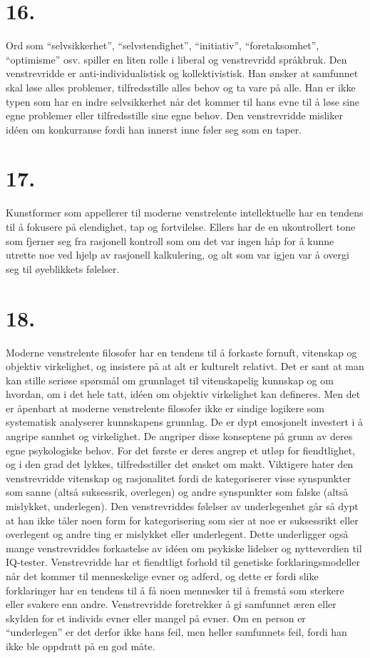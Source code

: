 \documentclass[oneside]{book}
\begin{document}
\section*{16.}
Ord som ``selvsikkerhet'', ``selvstendighet'', ``initiativ'',
``foretaksomhet'', ``optimisme'' osv. spiller en liten rolle i liberal og
venstrevridd språkbruk. Den venstrevridde er anti-individualistisk og
kollektivistisk. Han ønsker at samfunnet skal løse alles problemer,
tilfredsstille alles behov og ta vare på alle. Han er ikke typen som har en
indre selvsikkerhet når det kommer til hans evne til å løse sine egne problemer
eller tilfredsstille sine egne behov. Den venstrevridde misliker idéen om
konkurranse fordi han innerst inne føler seg som en taper.

\section*{17.}
Kunstformer som appellerer til moderne venstrelente intellektuelle har en
tendens til å fokusere på elendighet, tap og fortvilelse. Ellers har de en
ukontrollert tone som fjerner seg fra rasjonell kontroll som om det var ingen
håp for å kunne utrette noe ved hjelp av rasjonell kalkulering, og alt som var
igjen var å overgi seg til øyeblikkets følelser.

\section*{18.}
Moderne venstrelente filosofer har en tendens til å forkaste fornuft, vitenskap
og objektiv virkelighet, og insistere på at alt er kulturelt relativt. Det er
sant at man kan stille seriøse spørsmål om grunnlaget til vitenskapelig
kunnskap og om hvordan, om i det hele tatt, idéen om objektiv virkelighet kan
defineres. Men det er åpenbart at moderne venstrelente filosofer ikke er
sindige logikere som systematisk analyserer kunnskapens grunnlag. De er dypt
emosjonelt investert i å angripe sannhet og virkelighet. De angriper disse
konseptene på grunn av deres egne psykologiske behov. For det første er deres
angrep et utløp for fiendtlighet, og i den grad det lykkes, tilfredsstiller det
ønsket om makt. Viktigere hater den venstrevridde vitenskap og rasjonalitet
fordi de kategoriserer visse synspunkter som sanne (altså suksessrik,
overlegen) og andre synspunkter som falske (altså mislykket, underlegen). Den
venstrevriddes følelser av underlegenhet går så dypt at han ikke tåler noen
form for kategorisering som sier at noe er suksessrikt eller overlegent og
andre ting er mislykket eller underlegent. Dette underligger også mange
venstrevriddes forkastelse av idéen om psykiske lidelser og nytteverdien til
IQ-tester. Venstrevridde har et fiendtligt forhold til genetiske
forklaringsmodeller når det kommer til menneskelige evner og adferd, og dette
er fordi slike forklaringer har en tendens til å få noen mennesker til å
fremstå som sterkere eller svakere enn andre. Venstrevridde foretrekker å gi
samfunnet æren eller skylden for et individs evner eller mangel på evner.
Om en person er ``underlegen'' er det derfor ikke hans feil, men heller
samfunnets feil, fordi han ikke ble oppdratt på en god måte.
\end{document}
